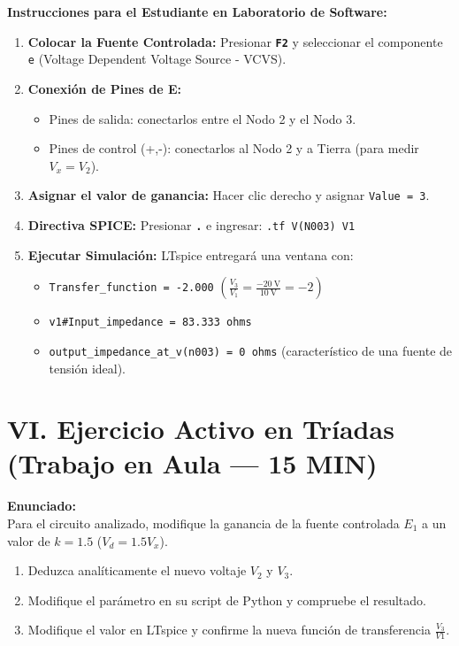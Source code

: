 \documentclass[11pt, a4paper]{article}
\newcommand{\tecla}[1]{\colorbox{gray!20}{\texttt{\textbf{#1}}}} %
\begin{document}
\textbf{Instrucciones para el Estudiante en Laboratorio de Software:}
\begin{enumerate}
    \item \textbf{Colocar la Fuente Controlada:} Presionar \tecla{F2} y seleccionar el componente \texttt{e} (Voltage Dependent Voltage Source - VCVS).
    \item \textbf{Conexión de Pines de E:}
    \begin{itemize}[label=$\circ$]
        \item Pines de salida: conectarlos entre el Nodo 2 y el Nodo 3.
        \item Pines de control (+,-): conectarlos al Nodo 2 y a Tierra (para medir $V_x = V_2$).
    \end{itemize}
    \item \textbf{Asignar el valor de ganancia:} Hacer clic derecho y asignar \texttt{Value = 3}.
    \item \textbf{Directiva SPICE:} Presionar \tecla{.} e ingresar: \texttt{.tf V(N003) V1}
    \item \textbf{Ejecutar Simulación:} LTspice entregará una ventana con:
    \begin{itemize}
        \item \texttt{Transfer\_function = -2.000} \quad $\left(\frac{V_3}{V_1} = \frac{\qty{-20}{\volt}}{\qty{10}{\volt}} = -2\right)$
        \item \texttt{v1\#Input\_impedance = 83.333 ohms}
        \item \texttt{output\_impedance\_at\_v(n003) = 0 ohms} (característico de una fuente de tensión ideal).
    \end{itemize}
\end{enumerate}

\section{VI. Ejercicio Activo en Tríadas (Trabajo en Aula — 15 MIN)}
\textbf{Enunciado:} \\
Para el circuito analizado, modifique la ganancia de la fuente controlada $E_1$ a un valor de $k = 1.5$ ($V_d = 1.5 V_x$).
\begin{enumerate}
    \item Deduzca analíticamente el nuevo voltaje $V_2$ y $V_3$.
    \item Modifique el parámetro en su script de Python y compruebe el resultado.
    \item Modifique el valor en LTspice y confirme la nueva función de transferencia $\frac{V_3}{V1}$.
\end{enumerate}
\end{document}
